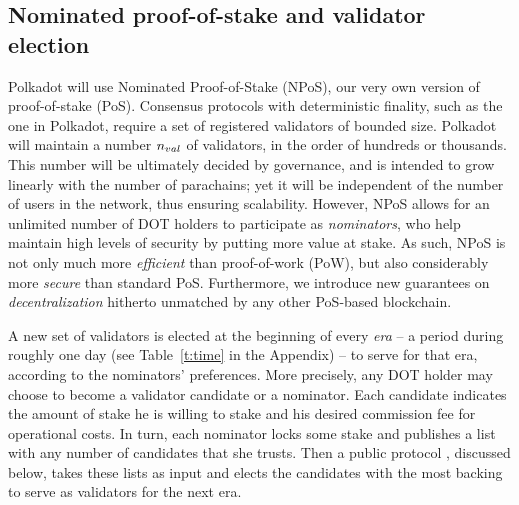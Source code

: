 \subsection{Nominated proof-of-stake and validator election}\label{sec:validators}
Polkadot will use Nominated Proof-of-Stake (NPoS), our very own version of proof-of-stake (PoS).
Consensus protocols with deterministic finality, such as the one in Polkadot, 
require a set of registered validators of bounded size.
Polkadot will maintain a number $n_{val}$ of validators, in the order of hundreds or thousands.
This number will be ultimately decided by governance, and is intended to grow linearly with the number of parachains;
yet it will be independent of the number of users in the network, thus ensuring scalability.
However, NPoS allows for an unlimited number of DOT holders to participate as \emph{nominators},
who help maintain high levels of security by putting more value at stake.
As such, NPoS is not only much more \emph{efficient} than proof-of-work (PoW),
but also considerably more \emph{secure} than standard PoS.
Furthermore, we introduce new guarantees on \emph{decentralization} hitherto unmatched by any other PoS-based blockchain.

A new set of validators is elected at the beginning of every \emph{era} -- a period during roughly one day (see Table~\ref{t:time} in the Appendix) --
to serve for that era, according to the nominators' preferences.
More precisely, any DOT holder may choose to become a validator candidate or a nominator.
Each candidate indicates the amount of stake he is willing to stake and his desired commission fee for operational costs.
In turn, each nominator locks some stake and publishes a list with any number of candidates that she trusts.
Then a public protocol , discussed below, takes these lists as input and elects the candidates
with the most backing to serve as validators for the next era.

